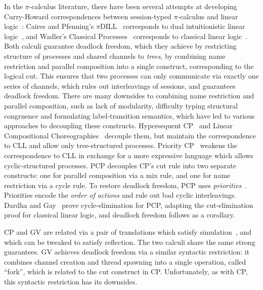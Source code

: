 In the $\pi$-calculus literature, there have been several attempts at developing Curry-Howard correspondences between session-typed $\pi$-calculus and linear logic~\cite{girard87}: Caires and Pfenning's $\pi$DILL~\cite{cairespfenning10} corresponds to dual intuitionistic linear logic~\cite{barber96}, and Wadler's Classical Processes~\cite[CP]{wadler14} corresponds to classical linear logic~\cite[CLL]{girard87}. Both calculi guarantee deadlock freedom, which they achieve by restricting structure of processes and shared channels to \emph{trees}, by combining name restriction and parallel composition into a single construct, corresponding to the logical cut. This ensures that two processes can only communicate via exactly one series of channels, which rules out interleavings of sessions, and guarantees deadlock freedom.
There are many downsides to combining name restriction and parallel composition, such as lack of modularity, difficulty typing structural congruence and formulating label-transition semantics, which have led to various approaches to decoupling these constructs. Hypersequent CP~\cite{MP18,kokkemontesi19popl,kokkemontesi19tlla} and Linear Compositional Choreographies~\cite{CarboneMS18} decouple them, but maintain the correspondence to CLL and allow only tree-structured processes. Priority CP~\cite[PCP]{dardhagay18extended} weakens the correspondence to CLL in exchange for a more expressive language which allows cyclic-structured processes. PCP decouples CP's cut rule into two separate constructs: one for parallel composition via a mix rule, and one for name restriction via a cycle rule. To restore deadlock freedom, PCP uses \emph{priorities}~\cite{kobayashi06,padovani14}. Priorities encode the \emph{order of actions} and rule out bad cyclic interleavings. Dardha and Gay~\cite{dardhagay18extended} prove cycle-elimination for PCP, adapting the cut-elimination proof for classical linear logic, and deadlock freedom follows as a corollary.

CP and GV are related via a pair of translations which satisfy simulation~\cite{lindleymorris16}, and which can be tweaked to satisfy reflection. The two calculi share the same strong guarantees. GV achieves deadlock freedom via a similar syntactic restriction: it combines channel creation and thread spawning into a single operation, called ``fork'', which is related to the cut construct in CP. Unfortunately, as with CP, this syntactic restriction has its downsides.

